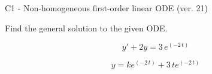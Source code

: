 \begin{exercise}
  \begin{exerciseTitle}C1 - Non-homogeneous first-order linear ODE (ver. 21)\end{exerciseTitle}
  \begin{exerciseStatement}
    
Find the general solution to the given ODE.

    
\[y'+2y= 3 \, e^{\left(-2 \, t\right)}\]

  \end{exerciseStatement}
  \begin{exerciseAnswer}
    
\[y= k e^{\left(-2 \, t\right)} + 3 \, t e^{\left(-2 \, t\right)}\]

  \end{exerciseAnswer}
\end{exercise}